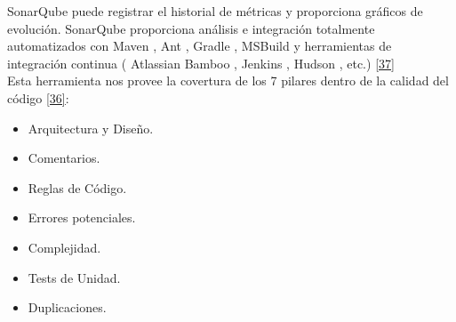 SonarQube puede registrar el historial de métricas y proporciona gráficos de evolución. SonarQube proporciona análisis e integración totalmente automatizados con Maven , Ant , Gradle , MSBuild y herramientas de integración continua ( Atlassian Bamboo , Jenkins , Hudson , etc.) \hyperlink{b37}{[37]}\\

Esta herramienta nos provee la covertura de los 7 pilares dentro de la calidad del código \hyperlink{b36}{[36]}: 

\begin{itemize}
	\item Arquitectura y Diseño.
	\item Comentarios.
	\item Reglas de Código.
	\item Errores potenciales.
	\item Complejidad.
	\item Tests de Unidad.
	\item Duplicaciones.
\end{itemize}





